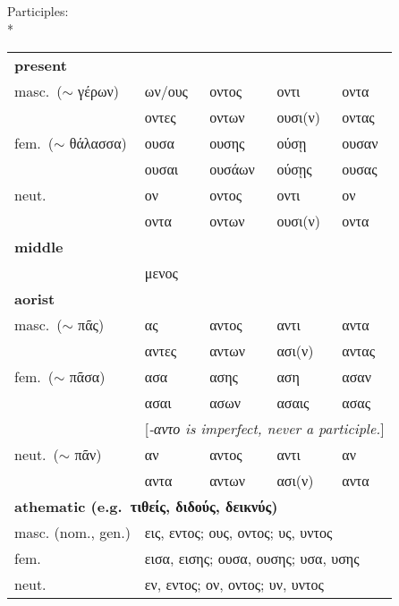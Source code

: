 \begin{small}
Participles:\\*
%
\begin{tabular}{lllll}
\multicolumn{5}{l}{\textbf{present}}\\
masc.~($\sim$ γέρων)      & ων\footnotemark/ους & οντος  & οντι  & οντα      \\
                          & οντες  & οντων & ουσι(ν) & οντας \\
fem.~($\sim$ θάλασσα)     & ουσα   & ουσης & ούσῃ & ουσαν \\
                          & ουσαι  & ουσάων & ούσῃς & ουσας \\
neut.                     & ον     & οντος  & οντι  & ον \\
                          & οντα   & οντων  & ουσι(ν) & οντα \\
\multicolumn{5}{l}{\textbf{middle}}\\
                          & μενος \\
\multicolumn{5}{l}{\textbf{aorist}}\\
masc.~($\sim$ πᾶς)        & ας     & αντος  &αντι     & αντα \\
                          & αντες  & αντων  & ασι(ν)  & αντας \\
fem.~($\sim$ πᾶσα)        & ασα    & ασης   & αση     & ασαν \\
                          & ασαι   & ασων   & ασαις   & ασας \\
                          & \multicolumn{4}{l}{[\emph{-αντο is imperfect, never a participle.}]} \\
neut.~($\sim$ πᾶν)        & αν     & αντος  & αντι    & αν \\
                          & αντα   & αντων  & ασι(ν)  & αντα \\
\multicolumn{5}{l}{\textbf{athematic (e.g.~τιθείς, διδούς, δεικνύς)}}\\
masc. (nom., gen.)        &  \multicolumn{4}{l}{εις, εντος; ους, οντος; υς, υντος} \\
fem.                      &  \multicolumn{4}{l}{εισα, εισης; ουσα, ουσης; υσα, υσης} \\
neut.                     &  \multicolumn{4}{l}{εν, εντος; ον, οντος; υν, υντος} \\

\end{tabular}


\pagebreak


\end{small}
